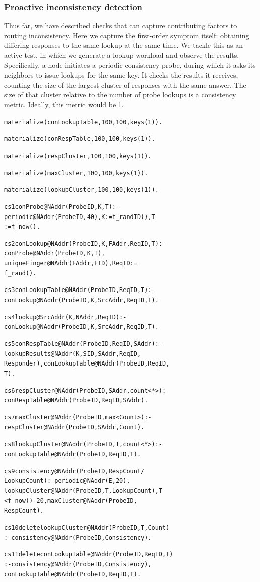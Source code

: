 \documentclass{sig-alt-full}
\newenvironment{overlog}{\begin{alltt}\footnotesize}{\end{alltt}}
\begin{document}
\subsubsection{Proactive inconsistency detection}
\label{sec:consistency:proactive}

Thus far, we have described checks that can capture
contributing factors to routing inconsistency.  Here we
capture the first-order symptom itself: obtaining
differing responses to the same lookup at the same time.
We tackle this as an active test, in which we generate a
lookup workload and observe the results.  Specifically,
a node initiates a periodic consistency probe,
during which it asks its neighbors to issue
lookups for the same key.  It checks the results it
receives, counting the size of the largest cluster of
responses with the same answer.  The size of
that cluster relative to the number of probe lookups
is a consistency metric.  Ideally, this metric
would be 1.
\begin{overlog}
materialize(conLookupTable, 100, 100, keys(1)).

materialize(conRespTable, 100, 100, keys(1)).

materialize(respCluster, 100, 100, keys(1)).

materialize(maxCluster, 100, 100, keys(1)).

materialize(lookupCluster, 100, 100, keys(1)).

cs1 conProbe@NAddr(ProbeID, K, T) :-
   periodic@NAddr(ProbeID, 40), K := f_randID(), T
   := f_now().

cs2 conLookup@NAddr(ProbeID, K, FAddr, ReqID, T) :-
   conProbe@NAddr(ProbeID, K, T),
   uniqueFinger@NAddr(FAddr, FID), ReqID :=
   f_rand().

cs3 conLookupTable@NAddr(ProbeID, ReqID, T) :-
   conLookup@NAddr(ProbeID, K, SrcAddr, ReqID, T).

cs4 lookup@SrcAddr(K, NAddr, ReqID) :-
   conLookup@NAddr(ProbeID, K, SrcAddr, ReqID, T).

cs5 conRespTable@NAddr(ProbeID, ReqID, SAddr) :-
   lookupResults@NAddr(K, SID, SAddr, ReqID,
   Responder), conLookupTable@NAddr(ProbeID, ReqID,
   T).

cs6 respCluster@NAddr(ProbeID, SAddr, count<*>) :-
   conRespTable@NAddr(ProbeID, ReqID, SAddr).

cs7 maxCluster@NAddr(ProbeID, max<Count>) :-
   respCluster@NAddr(ProbeID, SAddr, Count).

cs8 lookupCluster@NAddr(ProbeID, T, count<*>) :-
   conLookupTable@NAddr(ProbeID, ReqID, T).

cs9 consistency@NAddr(ProbeID, RespCount /
   LookupCount) :- periodic@NAddr(E, 20),
   lookupCluster@NAddr(ProbeID, T, LookupCount), T
   < f_now() - 20, maxCluster@NAddr(ProbeID,
   RespCount).

cs10 delete lookupCluster@NAddr(ProbeID, T, Count)
   :- consistency@NAddr(ProbeID, Consistency).

cs11 delete conLookupTable@NAddr(ProbeID, ReqID, T)
   :- consistency@NAddr(ProbeID, Consistency),
   conLookupTable@NAddr(ProbeID, ReqID, T).
\end{overlog}
\end{document}

